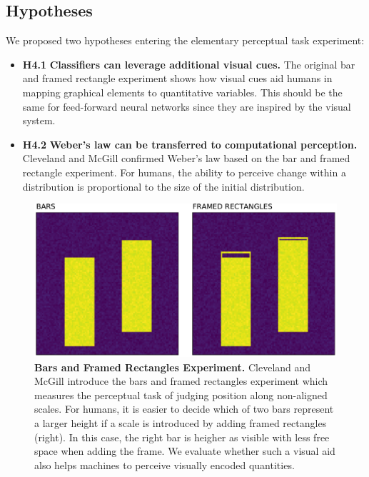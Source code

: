 \documentclass[journal]{vgtc}                %
\begin{document}
\subsection{Hypotheses}

We proposed two hypotheses entering the elementary perceptual task experiment:

\begin{itemize}
	\item \textbf{H4.1} \textbf{Classifiers can leverage additional visual cues.} The original bar and framed rectangle experiment shows how visual cues aid humans in mapping graphical elements to quantitative variables. This should be the same for feed-forward neural networks since they are inspired by the visual system.
	\item \textbf{H4.2} \textbf{Weber's law can be transferred to computational perception.} Cleveland and McGill confirmed Weber's law based on the bar and framed rectangle experiment. For humans, the ability to perceive change within a distribution is proportional to the size of the initial distribution.
\end{itemize}

\begin{figure}[t]
	  \includegraphics[width=\linewidth]{figure12_overview}
  \caption{\textbf{Bars and Framed Rectangles Experiment.} Cleveland and McGill introduce the bars and framed rectangles experiment which measures the perceptual task of judging position along non-aligned scales. For humans, it is easier to decide which of two bars represent a larger height if a scale is introduced by adding framed rectangles (right). In this case, the right bar is heigher as visible with less free space when adding the frame. We evaluate whether such a visual aid also helps machines to perceive visually encoded quantities.}
	\label{fig:bars_and_framed_rectangles_experiment}
\end{figure}
\end{document}
